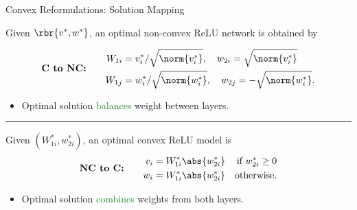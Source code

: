 \documentclass[usenames,dvipsnames,mathserif,notheorems]{beamer}
\newcommand{\horizontalrule}{
	{
			\vspace{-0.5em}
			\center \rule{\textwidth}{0.1em}
			\vspace{-0.2em}
		}
}
\newcommand{\green}[1]{\textcolor{ForestGreen}{#1}}
\begin{document}
\begin{frame}{Convex Reformulations: Solution Mapping}

	Given \( \rbr{v^*, w^*} \), an optimal non-convex ReLU network is obtained by

	\begin{equation*}
		\textbf{C to NC:} \quad \quad
		\begin{aligned}
			W_{1i} & = v_i^*/ \sqrt{\norm{v_i^*}}, \quad w_{2i} = \sqrt{\norm{v_i^*}}
			\\
			W_{1j} & = w_i^*/ \sqrt{\norm{w_i^*}}, \quad w_{2j} = -\sqrt{\norm{w_i^*}}.
		\end{aligned}
	\end{equation*}

	\pause
	\begin{itemize}
		\item Optimal solution \green{balances} weight between layers.
	\end{itemize}


	\pause
	\horizontalrule

	Given \( (W_{1i}^*, w_{2i}^*) \), an optimal convex ReLU model is
	\begin{equation*}
		\textbf{NC to C:} \quad \quad
		\begin{aligned}
			v_i & = W_{1i}^* \abs{w_{2i}^*} & \mbox{if \( w_{2i}^* \geq 0 \)} \\
			w_i & = W_{1i}^* \abs{w_{2i}^*} & \mbox{otherwise.}
		\end{aligned}
	\end{equation*}

	\pause
	\begin{itemize}
		\item Optimal solution \green{combines} weights from both layers.
	\end{itemize}

\end{frame}
\end{document}
